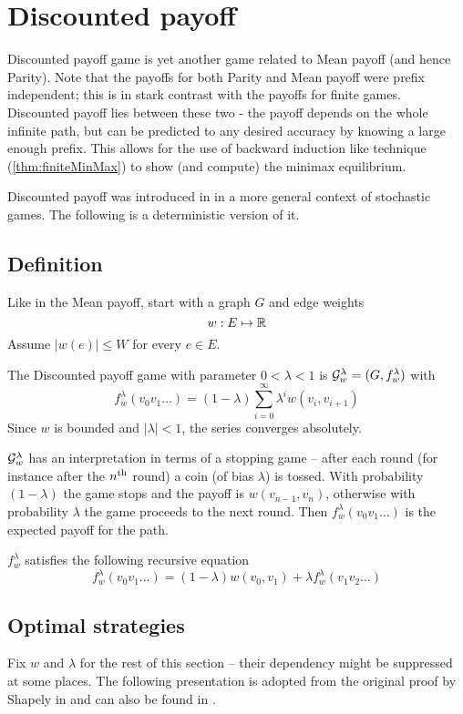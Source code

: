 \chapter{Discounted payoff}
\label{chap:disc}

Discounted payoff game is yet another game related to Mean payoff (and hence Parity). Note that the payoffs for both Parity and Mean payoff were prefix independent; this is in stark contrast with the payoffs for finite games. Discounted payoff lies between these two - the payoff depends on the whole infinite path, but can be predicted to any desired accuracy by knowing a large enough prefix. This allows for the use of backward induction like technique (\autoref{thm:finiteMinMax}) to show (and compute) the minimax equilibrium.

Discounted payoff was introduced in \cite{shapley_stochastic} in a more general context of stochastic games. The following is a deterministic version of it.

\section{Definition}
Like in the Mean payoff, start with a graph $G$ and edge weights
\[
    w : E \mapsto \mathbb{R}
\]
Assume $|w(e)| \leq W$ for every $e \in E$.

The Discounted payoff game with parameter $ 0 < \lambda < 1$ is $\mathcal{G}^\lambda_w=(G,f^\lambda_w)$ with
\[
    f^\lambda_w(v_0 v_1 \ldots ) =  (1-\lambda)\sum_{i=0}^\infty \lambda^i w(v_i,v_{i+1})
\]
Since $w$ is bounded and $|\lambda|<1$, the series converges absolutely.

$\mathcal{G}^\lambda_w$ has an interpretation in terms of a stopping game -- after each round (for instance after the ${n}^\text{th}$ round) a coin (of bias $\lambda$) is tossed. With probability $(1-\lambda)$ the game stops and the payoff is $w(v_{n-1},v_n)$, otherwise with probability $\lambda$ the game proceeds to the next round. Then $f^\lambda_w(v_0v_1 \ldots)$ is the expected payoff for the path.


$f^\lambda_w$ satisfies the following recursive equation
\begin{equation}
    f^\lambda_w(v_0 v_1 \ldots ) = (1-\lambda) w(v_0, v_1) + \lambda f^\lambda_w(v_1 v_2 \ldots) \label{eqn:disc-recursive}
\end{equation}
\section{Optimal strategies}
Fix $w$ and $\lambda$ for the rest of this section -- their dependency might be suppressed at some places. The following presentation is adopted from the original proof by Shapely in \cite{shapley_stochastic} and can also be found in \cite{zwick_meanpayoff}.


